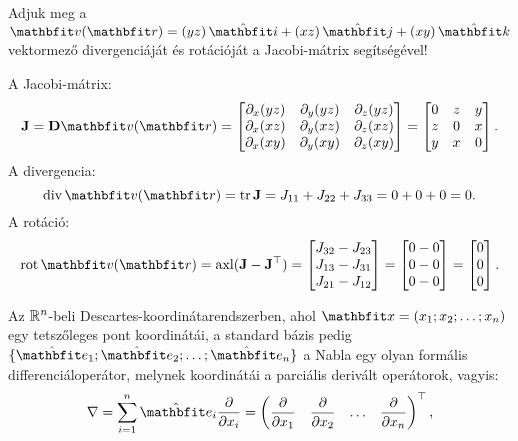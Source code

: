 \documentclass{szb-practice}
\begin{document}
\begin{example}
  Adjuk meg a $\rvec v(\coordvec) = \ijk{yz}{xz}{xy}$ vektormező
  divergenciáját és rotációját a Jacobi-mátrix segítségével!

  A Jacobi-mátrix:
  $$
    \rmat J = \DD \rvec v(\coordvec)
    = \begin{bmatrix}
      \partial_x (yz) & \partial_y (yz) & \partial_z (yz) \\
      \partial_x (xz) & \partial_y (xz) & \partial_z (xz) \\
      \partial_x (xy) & \partial_y (xy) & \partial_z (xy)
    \end{bmatrix}
    = \begin{bmatrix}
      0 & z & y \\
      z & 0 & x \\
      y & x & 0
    \end{bmatrix}
    \text.
  $$
  A divergencia:
  $$
    \Div \rvec v(\coordvec)
    = \trace \rmat J
    = J_{11} + J_{22} + J_{33}
    = 0 + 0 + 0
    = 0
    \text.
  $$
  A rotáció:
  $$
    \rot \rvec v(\coordvec)
    = \operatorname{axl}(\rmat J - \rmat J^\T)
    = \begin{bmatrix}
      J_{32} - J_{23} \\
      J_{13} - J_{31} \\
      J_{21} - J_{12}
    \end{bmatrix}
    = \begin{bmatrix}
      0 - 0 \\
      0 - 0 \\
      0 - 0
    \end{bmatrix}
    = \begin{bmatrix}
      0 \\ 0 \\ 0
    \end{bmatrix}
    \text.
  $$
\end{example}

\begin{definition}
  Az $\mathbb{R}^n$-beli Descartes-koordinátarendszerben, ahol $\rvec x = (x_1;
    x_2; \dots; x_n)$ egy tetszőleges pont koordinátái, a standard bázis pedig
  $\{ \uvec e_1; \uvec e_2; \dots; \uvec e_n \}$ a Nabla egy olyan formális
  differenciáloperátor, melynek koordinátái a parciális derivált operátorok,
  vagyis:
  $$
    \nabla = \sum_{i = 1}^n \uvec e_i \pdv{}{x_i}
    =
    \begin{pmatrix}
      \displaystyle\pdv{}{x_1} &
      \displaystyle\pdv{}{x_2} &
      \hdots                   &
      \displaystyle\pdv{}{x_n}
    \end{pmatrix}^\T
    \text,
  $$
\end{definition}
\end{document}

